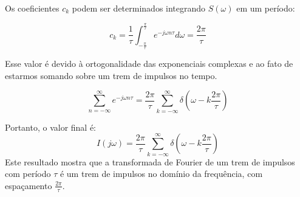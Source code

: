 Os coeficientes $c_k$ podem ser determinados integrando $S(\omega)$ em um período:

$$
c_k = \frac{1}{\tau} \int_{-\frac{\pi}{\tau}}^{\frac{\pi}{\tau}} e^{-j\omega n\tau} d\omega = \frac{2\pi}{\tau}
$$

Esse valor é devido à ortogonalidade das exponenciais complexas e ao fato de estarmos somando sobre um trem de impulsos no tempo.

$$
\sum_{n=-\infty}^{\infty} e^{-j\omega n\tau} = \frac{2\pi}{\tau} \sum_{k=-\infty}^{\infty} \delta\left(\omega - k\frac{2\pi}{\tau}\right)
$$

Portanto, o valor final é:
\begin{equation}
    I(j\omega) = \frac{2\pi}{\tau} \sum_{k=-\infty}^{\infty} \delta\left(\omega - k\frac{2\pi}{\tau}\right)    
\end{equation}
Este resultado mostra que a transformada de Fourier de um trem de impulsos com período $\tau$ é um trem de impulsos no domínio da frequência, com espaçamento $\frac{2\pi}{\tau}$.
